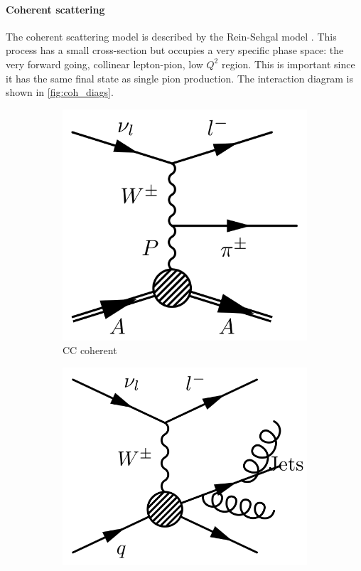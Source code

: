 \paragraph{Coherent scattering}
The coherent scattering model is described by the Rein-Sehgal model \cite{Rein_Sehgal_coh}. This process has a small cross-section but occupies a very specific phase space: the very forward going, collinear lepton-pion, low $Q^2$ region. This is important since it has the same final state as single pion production. The interaction diagram is shown in \autoref{fig:coh_diags}.
\begin{figure}[h]
	\centering
	\begin{subfigure}[t]{0.42\textwidth}
		\includegraphics[width=\textwidth, trim={0mm 0mm 0mm 0mm}, clip,page=1]{figures/niwg/diagrams/CCcoh}
		\caption{CC coherent}
		\label{fig:coh_diags}
	\end{subfigure}
	\begin{subfigure}[t]{0.42\textwidth}
		\includegraphics[width=\textwidth, trim={0mm 0mm 0mm 0mm}, clip,page=1]{figures/niwg/diagrams/CCmultipion}

\end{subfigure}
\end{figure}
